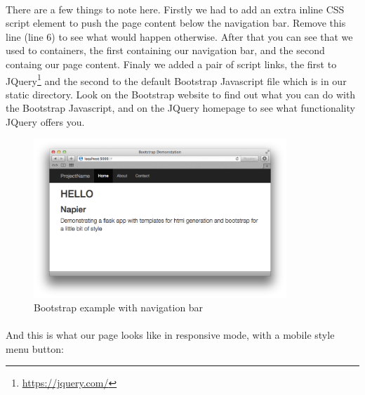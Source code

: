 \documentclass[12pt, a4paper, twoside]{book}
\begin{document}
\paragraph{} There are a few things to note here. Firstly we had to add an extra inline CSS script element to push the page content below the navigation bar. Remove this line (line 6) to see what would happen otherwise. After that you can see that we used to containers, the first containing our navigation bar, and the second containg our page content. Finaly we added a pair of script links, the first to JQuery\footnote{\url{https://jquery.com/}} and the second to the default Bootstrap Javascript file which is in our static directory. Look on the Bootstrap website to find out what you can do with the Bootstrap Javascript, and on the JQuery homepage to see what functionality JQuery offers you.

\begin{figure}[H]
\centering
\includegraphics[width=0.85\textwidth]{images/bootstrap-template-expanded.png}
\caption{Bootstrap example with navigation bar}
\label{fig:bootstrap-example-expanded}
\end{figure}

\paragraph{} And this is what our page looks like in responsive mode, with a mobile style menu button:
\end{document}
